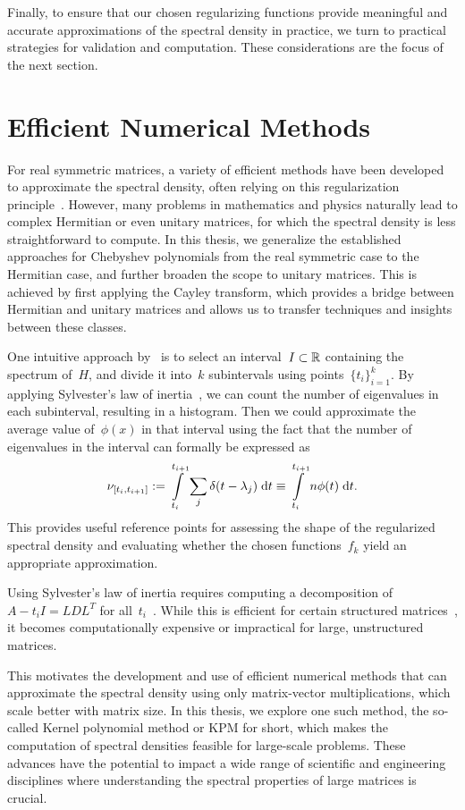 Finally, to ensure that our chosen regularizing functions provide meaningful and accurate approximations of the spectral density in practice, we turn to practical strategies for validation and computation. These considerations are the focus of the next section.

\section{Efficient Numerical Methods}
For real symmetric matrices, a variety of efficient methods have been developed to approximate the spectral density, often relying on this regularization principle~\cite{weisse2006,linsaadyang14,golub2013matrix}. However, many problems in mathematics and physics naturally lead to complex Hermitian or even unitary matrices, for which the spectral density is less straightforward to compute. In this thesis, we generalize the established approaches for Chebyshev polynomials from the real symmetric case to the Hermitian case, and further broaden the scope to unitary matrices. This is achieved by first applying the Cayley transform, which provides a bridge between Hermitian and unitary matrices and allows us to transfer techniques and insights between these classes.

One intuitive approach by~\cite{linsaadyang14} is to select an interval~$I \subset \mathbb{R}$ containing the spectrum of~$H$, and divide it into~$k$ subintervals using points~$\{t_i\}_{i=1}^k$. By applying Sylvester's law of inertia~\cite{sylvester1852}, we can count the number of eigenvalues in each subinterval, resulting in a histogram. Then we could approximate the average value of~$\phi(x)$ in that interval using the fact that the number of eigenvalues in the interval can formally be expressed as
\begin{equation} \label{eq:nu_a_b}
    \nu_{[t_i, t_{i+1}]} := \int\limits_{t_i}^{t_{i+1}} \sum_j \delta(t - \lambda_j) \;\mathrm{d}t \equiv \int\limits_{t_i}^{t_{i+1}} n \phi(t) \;\mathrm{d}t.
\end{equation}
This provides useful reference points for assessing the shape of the regularized spectral density and evaluating whether the chosen functions~$f_k$ yield an appropriate approximation.

Using Sylvester's law of inertia requires computing a decomposition of~$A - t_i I = LDL^T$ for all~$t_i$~\cite{golub2013matrix}. While this is efficient for certain structured matrices~\cite{bennermach2012}, it becomes computationally expensive or impractical for large, unstructured matrices.

This motivates the development and use of efficient numerical methods that can approximate the spectral density using only matrix-vector multiplications, which scale better with matrix size. In this thesis, we explore one such method, the so-called Kernel polynomial method or KPM for short, which makes the computation of spectral densities feasible for large-scale problems. These advances have the potential to impact a wide range of scientific and engineering disciplines where understanding the spectral properties of large matrices is crucial.